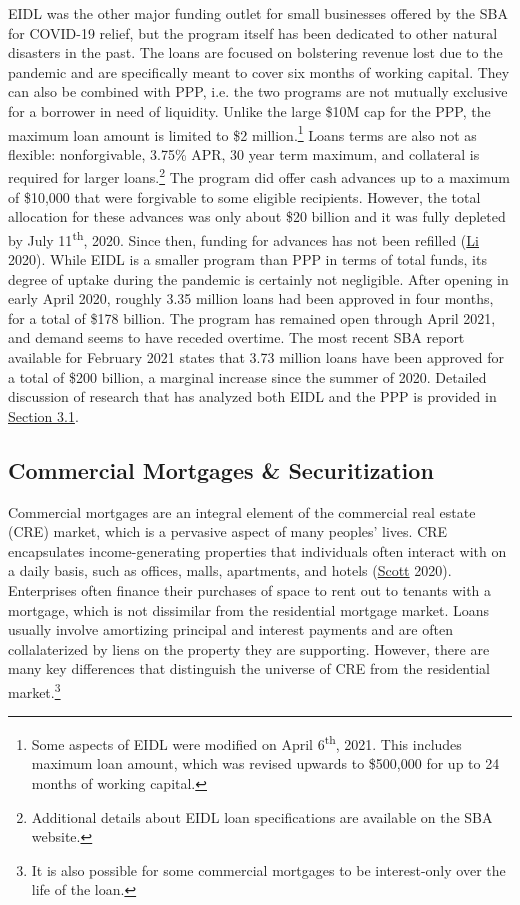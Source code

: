 \documentclass[11pt]{article} %
\begin{document}
EIDL was the other major funding outlet for small businesses offered by the SBA for COVID-19 relief, but the program itself has been dedicated to other natural disasters in the past. The loans are focused on bolstering revenue lost due to the pandemic and are specifically meant to cover six months of working capital. They can also be combined with PPP, i.e. the two programs are not mutually exclusive for a borrower in need of liquidity. Unlike the large \$10M cap for the PPP, the maximum loan amount is limited to \$2 million.\footnote{Some aspects of EIDL were modified on April 6\textsuperscript{th}, 2021. This includes maximum loan amount, which was revised upwards to \$500,000 for up to 24 months of working capital.} Loans terms are also not as flexible: nonforgivable, 3.75\% APR, 30 year term maximum, and collateral is required for larger loans.\footnote{Additional details about EIDL loan specifications are available on the SBA website.} The program did offer cash advances up to a maximum of \$10,000 that were forgivable to some eligible recipients. However, the total allocation for these advances was only about \$20 billion and it was fully depleted by July 11\textsuperscript{th}, 2020. Since then, funding for advances has not been refilled (\hyperlink{Meng}{Li} 2020). While EIDL is a smaller program than PPP in terms of total funds, its degree of uptake during the pandemic is certainly not negligible. After opening in early April 2020, roughly 3.35 million loans had been approved in four months, for a total of \$178 billion. The program has remained open through April 2021, and demand seems to have receded overtime. The most recent SBA report available for February 2021 states that 3.73 million loans have been approved for a total of \$200 billion, a marginal increase since the summer of 2020. Detailed discussion of research that has analyzed both EIDL and the PPP is provided in \hyperlink{On PPP}{Section 3.1}. 

\subsection{Commercial Mortgages \& Securitization}

Commercial mortgages are an integral element of the commercial real estate (CRE) market, which is a pervasive aspect of many peoples' lives. CRE encapsulates income-generating properties that individuals often interact with on a daily basis, such as offices, malls, apartments, and hotels (\hyperlink{Scott}{Scott} 2020). Enterprises often finance their purchases of space to rent out to tenants with a mortgage, which is not dissimilar from the residential mortgage market. Loans usually involve amortizing principal and interest payments and are often collalaterized by liens on the property they are supporting. However, there are many key differences that distinguish the universe of CRE from the residential market.\footnote{It is also possible for some commercial mortgages to be interest-only over the life of the loan.} 
\end{document}
